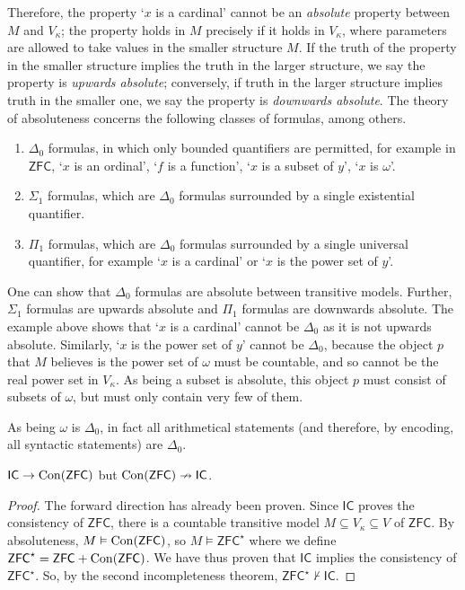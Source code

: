 Therefore, the property `\( x \) is a cardinal' cannot be an \emph{absolute} property between \( M \) and \( V_\kappa \); the property holds in \( M \) precisely if it holds in \( V_\kappa \), where parameters are allowed to take values in the smaller structure \( M \).
If the truth of the property in the smaller structure implies the truth in the larger structure, we say the property is \emph{upwards absolute}; conversely, if truth in the larger structure implies truth in the smaller one, we say the property is \emph{downwards absolute}.
The theory of absoluteness concerns the following classes of formulas, among others.
\begin{enumerate}
    \item \( \Delta_0 \) formulas, in which only bounded quantifiers are permitted, for example in \( \mathsf{ZFC} \), `\( x \) is an ordinal', `\( f \) is a function', `\( x \) is a subset of \( y \)', `\( x \) is \( \omega \)'.
    \item \( \Sigma_1 \) formulas, which are \( \Delta_0 \) formulas surrounded by a single existential quantifier.
    \item \( \Pi_1 \) formulas, which are \( \Delta_0 \) formulas surrounded by a single universal quantifier, for example `\( x \) is a cardinal' or `\( x \) is the power set of \( y \)'.
\end{enumerate}
One can show that \( \Delta_0 \) formulas are absolute between transitive models.
Further, \( \Sigma_1 \) formulas are upwards absolute and \( \Pi_1 \) formulas are downwards absolute.
The example above shows that `\( x \) is a cardinal' cannot be \( \Delta_0 \) as it is not upwards absolute.
Similarly, `\( x \) is the power set of \( y \)' cannot be \( \Delta_0 \), because the object \( p \) that \( M \) believes is the power set of \( \omega \) must be countable, and so cannot be the real power set in \( V_\kappa \).
As being a subset is absolute, this object \( p \) must consist of subsets of \( \omega \), but must only contain very few of them.

As being \( \omega \) is \( \Delta_0 \), in fact all arithmetical statements (and therefore, by encoding, all syntactic statements) are \( \Delta_0 \).
\begin{theorem}
    \( \mathsf{IC} \to \operatorname{Con}(\mathsf{ZFC}) \) but \( \operatorname{Con}(\mathsf{ZFC}) \nrightarrow \mathsf{IC} \).
\end{theorem}
\begin{proof}
    The forward direction has already been proven.
    Since \( \mathsf{IC} \) proves the consistency of \( \mathsf{ZFC} \), there is a countable transitive model \( M \subseteq V_\kappa \subseteq V \) of \( \mathsf{ZFC} \).
    By absoluteness, \( M \vDash \operatorname{Con}(\mathsf{ZFC}) \), so \( M \vDash \mathsf{ZFC}^\star \) where we define \( \mathsf{ZFC}^\star = \mathsf{ZFC} + \operatorname{Con}(\mathsf{ZFC}) \).
    We have thus proven that \( \mathsf{IC} \) implies the consistency of \( \mathsf{ZFC}^\star \).
    So, by the second incompleteness theorem, \( \mathsf{ZFC}^\star \nvdash \mathsf{IC} \).
\end{proof}

